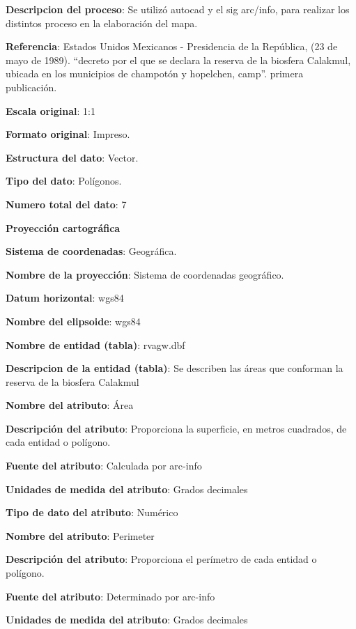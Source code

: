 \documentclass[twoside]{book}
\begin{document}
{{\textbf{Descripcion del proceso}: Se utilizó autocad y el sig arc/info, para realizar los distintos proceso en la elaboración del mapa.

\textbf{Referencia}: Estados Unidos Mexicanos - Presidencia de la República, (23 de mayo de 1989). “decreto por el que se declara la reserva de la biosfera Calakmul, ubicada en los municipios de champotón y hopelchen, camp”. primera publicación.

\textbf{Escala original}: 1:1

\textbf{Formato original}: Impreso.


\textbf{Estructura del dato}: Vector.

\textbf{Tipo del dato}: Polígonos.

\textbf{Numero total del dato}: 7

\textbf{Proyección cartográfica}

\textbf{Sistema de coordenadas}: Geográfica.

\textbf{Nombre de la proyección}: Sistema de coordenadas geográfico.

\textbf{Datum horizontal}: wgs84

\textbf{Nombre del elipsoide}: wgs84


\textbf{Nombre de entidad (tabla)}: rvagw.dbf

\textbf{Descripcion de la entidad (tabla)}: Se describen las áreas que conforman la reserva de la biosfera Calakmul

\textbf{Nombre del atributo}: Área

\textbf{Descripción del atributo}: Proporciona la superficie, en metros cuadrados, de cada entidad o polígono.

\textbf{Fuente del atributo}: Calculada por arc-info

\textbf{Unidades de medida del atributo}: Grados decimales

\textbf{Tipo de dato del atributo}: Numérico

\textbf{Nombre del atributo}: Perimeter

\textbf{Descripción del atributo}: Proporciona el perímetro de cada entidad o polígono.

\textbf{Fuente del atributo}: Determinado por arc-info

\textbf{Unidades de medida del atributo}: Grados decimales

}}
\end{document}
